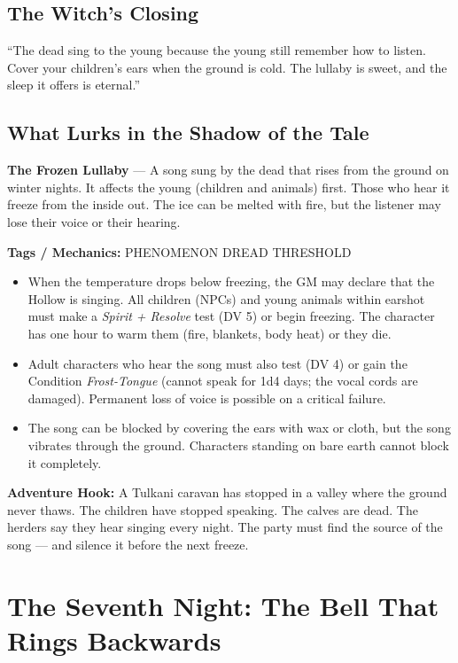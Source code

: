 \documentclass[10pt,twoside]{book}
\newcommand{\tag}[1]{\textsc{#1}}
\begin{document}
\section*{The Witch's Closing}
``The dead sing to the young because the young still remember how to listen. Cover your children's ears when the ground is cold. The lullaby is sweet, and the sleep it offers is eternal.''

\section*{What Lurks in the Shadow of the Tale}
\begin{infobox}
\textbf{The Frozen Lullaby} --- A song sung by the dead that rises from the ground on winter nights. It affects the young (children and animals) first. Those who hear it freeze from the inside out. The ice can be melted with fire, but the listener may lose their voice or their hearing.

\textbf{Tags / Mechanics:} \tag{PHENOMENON} \tag{DREAD} \tag{THRESHOLD}

\begin{itemize}
\item When the temperature drops below freezing, the GM may declare that the Hollow is singing. All children (NPCs) and young animals within earshot must make a \textit{Spirit + Resolve} test (DV 5) or begin freezing. The character has one hour to warm them (fire, blankets, body heat) or they die.
\item Adult characters who hear the song must also test (DV 4) or gain the Condition \textit{Frost-Tongue} (cannot speak for 1d4 days; the vocal cords are damaged). Permanent loss of voice is possible on a critical failure.
\item The song can be blocked by covering the ears with wax or cloth, but the song vibrates through the ground. Characters standing on bare earth cannot block it completely.
\end{itemize}

\textbf{Adventure Hook:} A Tulkani caravan has stopped in a valley where the ground never thaws. The children have stopped speaking. The calves are dead. The herders say they hear singing every night. The party must find the source of the song --- and silence it before the next freeze.
\end{infobox}

\chapter{The Seventh Night: The Bell That Rings Backwards}
\end{document}

